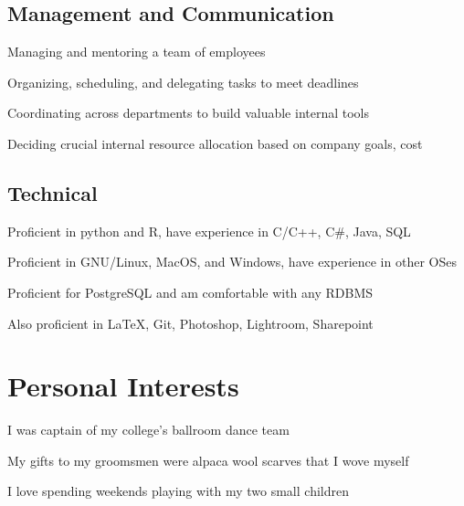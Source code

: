 \documentclass[]{deedy-resume-openfont}
\begin{document}
\begin{minipage}[t]{0.66\textwidth}
\subsection{Management and Communication}
\vspace{\topsep} %
\begin{tightemize}
	\item Managing and mentoring a team of employees
	\item Organizing, scheduling, and delegating tasks to meet deadlines
	\item Coordinating across departments to build valuable internal tools
	\item Deciding crucial internal resource allocation based on company goals, cost
\end{tightemize}
\subsection{Technical}
\vspace{\topsep} %
\begin{tightemize}
\item Proficient in python and R, have experience in C/C++, C\#, Java, SQL
\item Proficient in GNU/Linux, MacOS, and Windows, have experience in other OSes
\item Proficient for PostgreSQL and am comfortable with any RDBMS
\item Also proficient in \LaTeX, Git, Photoshop, Lightroom, Sharepoint
\end{tightemize}

\section{Personal Interests}
\vspace{\topsep} %
\begin{tightemize}
\item I was captain of my college's ballroom dance team
\item My gifts to my groomsmen were alpaca wool scarves that I wove myself
\item I love spending weekends playing with my two small children
\end{tightemize}




\end{minipage}
\end{document}

